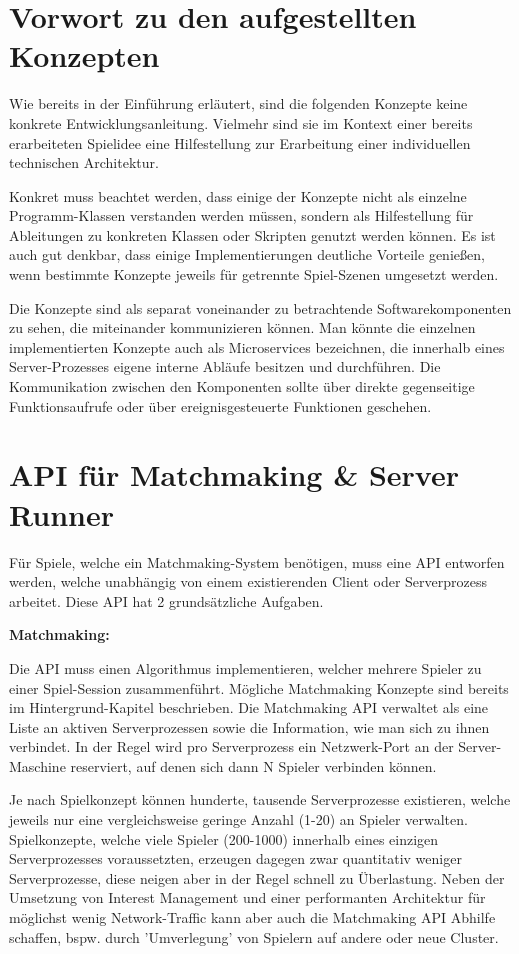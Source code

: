 \section{Vorwort zu den aufgestellten Konzepten}

Wie bereits in der Einführung erläutert, sind die folgenden Konzepte keine konkrete Entwicklungsanleitung. Vielmehr sind sie im Kontext einer bereits erarbeiteten Spielidee eine Hilfestellung zur Erarbeitung einer individuellen technischen Architektur.

Konkret muss beachtet werden, dass einige der Konzepte nicht als einzelne Programm-Klassen verstanden werden müssen, sondern als Hilfestellung für Ableitungen zu konkreten Klassen oder Skripten genutzt werden können. Es ist auch gut denkbar, dass einige Implementierungen deutliche Vorteile genießen, wenn bestimmte Konzepte jeweils für getrennte Spiel-Szenen \cite{Wikipedia.2012} umgesetzt werden.

Die Konzepte sind als separat voneinander zu betrachtende Softwarekomponenten zu sehen, die miteinander kommunizieren können. Man könnte die einzelnen implementierten Konzepte auch als Microservices \cite{Thones.2015} bezeichnen, die innerhalb eines Server-Prozesses eigene interne Abläufe besitzen und durchführen. Die Kommunikation zwischen den Komponenten sollte über direkte gegenseitige Funktionsaufrufe oder über ereignisgesteuerte Funktionen \cite{Michelson.2006} geschehen.

\section{API für Matchmaking \& Server Runner}

Für Spiele, welche ein Matchmaking-System benötigen, muss eine API entworfen werden, welche unabhängig von einem existierenden Client oder Serverprozess arbeitet. Diese API hat 2 grundsätzliche Aufgaben. 

\textbf{Matchmaking:}

Die API muss einen Algorithmus implementieren, welcher mehrere Spieler zu einer Spiel-Session zusammenführt. Mögliche Matchmaking Konzepte sind bereits im Hintergrund-Kapitel beschrieben. Die Matchmaking API verwaltet als eine Liste an aktiven Serverprozessen sowie die Information, wie man sich zu ihnen verbindet. In der Regel wird pro Serverprozess ein Netzwerk-Port an der Server-Maschine reserviert, auf denen sich dann N Spieler verbinden können.

Je nach Spielkonzept können hunderte, tausende Serverprozesse existieren, welche jeweils nur eine vergleichsweise geringe Anzahl (1-20) an Spieler verwalten. Spielkonzepte, welche viele Spieler (200-1000) innerhalb eines einzigen Serverprozesses voraussetzten, erzeugen dagegen zwar quantitativ weniger Serverprozesse, diese neigen aber in der Regel schnell zu Überlastung. Neben der Umsetzung von Interest Management und einer performanten Architektur für möglichst wenig Network-Traffic kann aber auch die Matchmaking API Abhilfe schaffen, bspw. durch 'Umverlegung' von Spielern auf andere oder neue Cluster.

